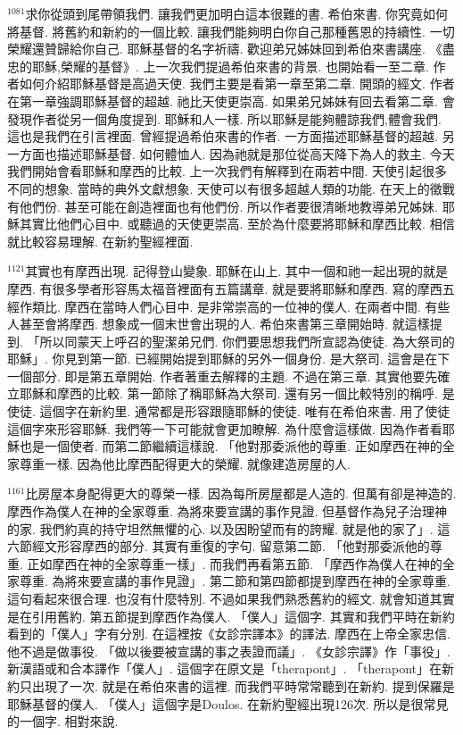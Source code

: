 \documentclass{book}
\begin{document}
$^{1081}$求你從頭到尾帶領我們.
讓我們更加明白這本很難的書.
希伯來書.
你究竟如何將基督.
將舊約和新約的一個比較.
讓我們能夠明白你自己那種舊恩的持續性.
一切榮耀還贊歸給你自己.
耶穌基督的名字祈禱.
歡迎弟兄姊妹回到希伯來書講座.
《盡忠的耶穌,榮耀的基督》.
上一次我們提過希伯來書的背景.
也開始看一至二章.
作者如何介紹耶穌基督是高過天使.
我們主要是看第一章至第二章.
開頭的經文.
作者在第一章強調耶穌基督的超越.
祂比天使更崇高.
如果弟兄姊妹有回去看第二章.
會發現作者從另一個角度提到.
耶穌和人一樣.
所以耶穌是能夠體諒我們,體會我們.
這也是我們在引言裡面.
曾經提過希伯來書的作者.
一方面描述耶穌基督的超越.
另一方面也描述耶穌基督.
如何體恤人.
因為祂就是那位從高天降下為人的救主.
今天我們開始會看耶穌和摩西的比較.
上一次我們有解釋到在兩若中間.
天使引起很多不同的想象.
當時的典外文獻想象.
天使可以有很多超越人類的功能.
在天上的徵戰有他們份.
甚至可能在創造裡面也有他們份.
所以作者要很清晰地教導弟兄姊妹.
耶穌其實比他們心目中.
或聽過的天使更崇高.
至於為什麼要將耶穌和摩西比較.
相信就比較容易理解.
在新約聖經裡面.

$^{1121}$其實也有摩西出現.
記得登山變象.
耶穌在山上.
其中一個和祂一起出現的就是摩西.
有很多學者形容馬太福音裡面有五篇講章.
就是要將耶穌和摩西.
寫的摩西五經作類比.
摩西在當時人們心目中.
是非常崇高的一位神的僕人.
在兩者中間.
有些人甚至會將摩西.
想象成一個末世會出現的人.
希伯來書第三章開始時.
就這樣提到.
「所以同蒙天上呼召的聖潔弟兄們.
你們要思想我們所宣認為使徒.
為大祭司的耶穌」.
你見到第一節.
已經開始提到耶穌的另外一個身份.
是大祭司.
這會是在下一個部分.
即是第五章開始.
作者著重去解釋的主題.
不過在第三章.
其實他要先確立耶穌和摩西的比較.
第一節除了稱耶穌為大祭司.
還有另一個比較特別的稱呼.
是使徒.
這個字在新約里.
通常都是形容跟隨耶穌的使徒.
唯有在希伯來書.
用了使徒這個字來形容耶穌.
我們等一下可能就會更加瞭解.
為什麼會這樣做.
因為作者看耶穌也是一個使者.
而第二節繼續這樣說.
「他對那委派他的尊重.
正如摩西在神的全家尊重一樣.
因為他比摩西配得更大的榮耀.
就像建造房屋的人.

$^{1161}$比房屋本身配得更大的尊榮一樣.
因為每所房屋都是人造的.
但萬有卻是神造的.
摩西作為僕人在神的全家尊重.
為將來要宣講的事作見證.
但基督作為兒子治理神的家.
我們約真的持守坦然無懼的心.
以及因盼望而有的誇耀.
就是他的家了」.
這六節經文形容摩西的部分.
其實有重復的字句.
留意第二節.
「他對那委派他的尊重.
正如摩西在神的全家尊重一樣」.
而我們再看第五節.
「摩西作為僕人在神的全家尊重.
為將來要宣講的事作見證」.
第二節和第四節都提到摩西在神的全家尊重.
這句看起來很合理.
也沒有什麼特別.
不過如果我們熟悉舊約的經文.
就會知道其實是在引用舊約.
第五節提到摩西作為僕人.
「僕人」這個字.
其實和我們平時在新約看到的「僕人」字有分別.
在這裡按《女診宗譯本》的譯法.
摩西在上帝全家忠信.
他不過是做事役.
「做以後要被宣講的事之表證而議」.
《女診宗譯》作「事役」.
新漢語或和合本譯作「僕人」.
這個字在原文是「therapont」.
「therapont」在新約只出現了一次.
就是在希伯來書的這裡.
而我們平時常常聽到在新約.
提到保羅是耶穌基督的僕人.
「僕人」這個字是Doulos.
在新約聖經出現126次.
所以是很常見的一個字.
相對來說.
\end{document}
